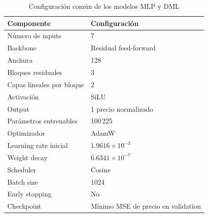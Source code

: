 \begin{table}[htbp]
\centering
\caption{Configuración común de los modelos MLP y DML}
\label{tab:shared_ml_architecture}
\begin{tabular}{ll}
\toprule
\textbf{Componente} & \textbf{Configuración} \\
\midrule
Número de inputs        & 7 \\
Backbone                 & Residual feed-forward \\
Anchura                  & 128 \\
Bloques residuales       & 3 \\
Capas lineales por bloque& 2 \\
Activación               & SiLU \\
Output                    & 1 precio normalizado \\
Parámetros entrenables   & 100\,225 \\
Optimizador              & AdamW \\
Learning rate inicial    & $1.9616\times10^{-3}$ \\
Weight decay             & $6.6341\times10^{-7}$ \\
Scheduler                 & Cosine \\
Batch size                & 1024 \\
Early stopping            & No \\
Checkpoint                & Mínimo MSE de precio en validation \\
\bottomrule
\end{tabular}
\end{table}